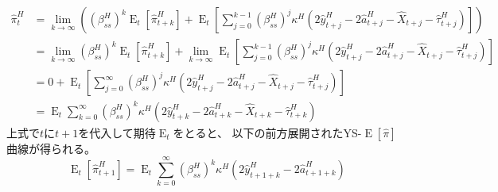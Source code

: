 \begin{equation}
\label{form:chapter5_two_plane_ys_forward_pi_H_lim_eq}
    \begin{aligned}
        \hat{\pi}_t^H
        &=\lim_{k\to\infty}\left((\beta_{ss}^H)^k\operatorname{E}_t[\hat{\pi}_{t+k}^H]+\operatorname{E}_t\left[\sum_{j=0}^{k-1}(\beta_{ss}^H)^j\kappa^H(2\hat{y}_{t+j}^H-2\hat{a}_{t+j}^H-\hat{X}_{t+j}-\hat{\tau}_{t+j}^H)\right]\right) \\
        &=\lim_{k\to\infty}(\beta_{ss}^H)^k\operatorname{E}_t[\hat{\pi}_{t+k}^H]+\lim_{k\to\infty}\operatorname{E}_t\left[\sum_{j=0}^{k-1}(\beta_{ss}^H)^j\kappa^H(2\hat{y}_{t+j}^H-2\hat{a}_{t+j}^H-\hat{X}_{t+j}-\hat{\tau}_{t+j}^H)\right] \\
        &=0+\operatorname{E}_t\left[\sum_{j=0}^{\infty}(\beta_{ss}^H)^j\kappa^H(2\hat{y}_{t+j}^H-2\hat{a}_{t+j}^H-\hat{X}_{t+j}-\hat{\tau}_{t+j}^H)\right] \\
        &=\operatorname{E}_t\sum_{k=0}^{\infty}(\beta_{ss}^H)^k\kappa^H(2\hat{y}_{t+k}^H-2\hat{a}_{t+k}^H-\hat{X}_{t+k}-\hat{\tau}_{t+k}^H)
    \end{aligned}
\end{equation}
上式で\(t\)に\(t+1\)を代入して期待\(\operatorname{E}_t\)をとると、
以下の前方展開されたYS-\(\operatorname{E}[\hat{\pi}]\)曲線が得られる。
\begin{equation}
\label{form:chapter5_two_plane_ys_forward_E_pi_H_lim_eq}
    \operatorname{E}_t[\hat{\pi}_{t+1}^H]=\operatorname{E}_t\sum_{k=0}^{\infty}(\beta_{ss}^H)^k\kappa^H(2\hat{y}_{t+1+k}^H-2\hat{a}_{t+1+k}^H)
\end{equation}

